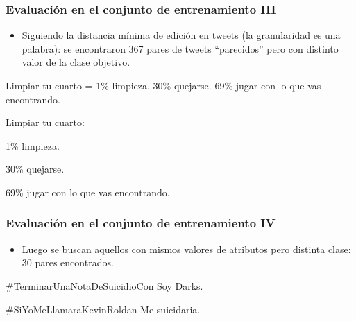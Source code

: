 \begin{frame}
    \frametitle{Evaluación en el conjunto de entrenamiento III}

    \begin{itemize}
        \item Siguiendo la distancia mínima de edición en tweets (la granularidad es una palabra): se encontraron 367 pares de tweets ``parecidos'' pero con distinto valor de la clase objetivo.
    \end{itemize}

    \begin{example}
        Limpiar tu cuarto = 1\% limpieza. 30\% quejarse. 69\% jugar con lo que vas encontrando.
    \end{example}

    \begin{example}
        Limpiar tu cuarto:

        1\% limpieza.

        30\% quejarse.

        69\% jugar con lo que vas encontrando.
    \end{example}
\end{frame}

\begin{frame}
    \frametitle{Evaluación en el conjunto de entrenamiento IV}

    \begin{itemize}
        \item Luego se buscan aquellos con mismos valores de atributos pero distinta clase: 30 pares encontrados.
    \end{itemize}

    \begin{example}
        #TerminarUnaNotaDeSuicidioCon Soy Darks.
    \end{example}

    \begin{example}
        #SiYoMeLlamaraKevinRoldan Me suicidaria.
    \end{example}
\end{frame}

